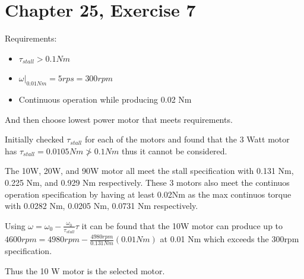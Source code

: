 \documentclass[12pt]{article}
\begin{document}
\section*{Chapter 25, Exercise 7}
Requirements: 
\begin{itemize}
    \item 
    $\tau_{stall} > 0.1 Nm$

    \item 
    $\omega\rvert_{0.01 Nm} = 5 rps = 300 rpm$

    \item
    Continuous operation while producing 0.02 Nm
\end{itemize}
And then choose lowest power motor that meets requirements.

\vspace{0.1in}
{\setlength{\parindent}{0cm}
Initially checked $\tau_{stall}$ for each of the motors and found that the 3 Watt motor has $\tau_{stall} = 0.0105 Nm \not> 0.1 Nm$ thus it cannot be considered. 

The 10W, 20W, and 90W motor all meet the stall specification with 0.131 Nm, 0.225 Nm, and 0.929 Nm respectively.
These 3 motors also meet the continuos operation specification by having at least 0.02Nm as the max continuos torque with 0.0282 Nm, 0.0205 Nm, 0.0731 Nm respectively.

Using $\omega = \omega_0 - \frac{\omega_0}{\tau_{stall}}\tau$ it can be found that the 10W motor can produce up to $4600 rpm = 4980 rpm - \frac{4980 rpm}{0.131 Nm}(0.01 Nm)$ at 0.01 Nm which exceeds the 300rpm specification.

Thus the 10 W motor is the selected motor.
}
\end{document}
